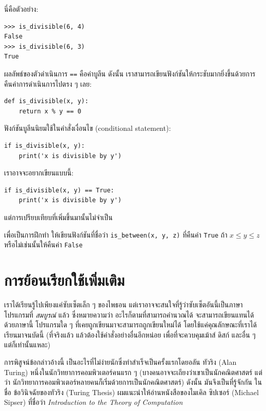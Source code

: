นี่คือตัวอย่าง:

\begin{verbatim}
>>> is_divisible(6, 4)
False
>>> is_divisible(6, 3)
True
\end{verbatim}
%
ผลลัพธ์ของตัวดำเนินการ {\tt ==} คือค่าบูลีน ดังนั้น 
เราสามารถเขียนฟังก์ชันให้กระชับมากยิ่งขึ้นด้วยการคืนค่าการดำเนินการไปตรง ๆ เลย:

\begin{verbatim}
def is_divisible(x, y):
    return x % y == 0
\end{verbatim}
%

ฟังก์ชันบูลีนนิยมใช้ในคำสั่งเงื่อนไข (conditional statement):

\begin{verbatim}
if is_divisible(x, y):
    print('x is divisible by y')
\end{verbatim}
%
เราอาจจะอยากเขียนแบบนี้:

\begin{verbatim}
if is_divisible(x, y) == True:
    print('x is divisible by y')
\end{verbatim}
%
แต่การเปรียบเทียบที่เพิ่มขึ้นมานั้นไม่จำเป็น

เพื่อเป็นการฝึกทำ ให้เขียนฟังก์ชันที่ชื่อว่า \verb"is_between(x, y, z)" ที่คืนค่า 
{\tt True} ถ้า {\scriptsize$x \le y \le z$} หรือไม่เช่นนั้นให้คืนค่า {\tt False}


\section{การย้อนเรียกใช้เพิ่มเติม} %
\label{more.recursion}

เราได้เรียนรู้ไปเพียงแค่ซับเซ็ตเล็ก ๆ ของไพธอน 
แต่เราอาจจะสนใจที่รู้ว่าซับเซ็ตอันนี้เป็นภาษาโปรแกรมที่ {\em สมบูรณ์} แล้ว ซึ่งหมายความว่า อะไรก็ตามที่สามารถคำนวณได้
จะสามารถเขียนแทนได้ด้วยภาษานี้  โปรแกรมใด ๆ ที่เคยถูกเขียนมาจะสามารถถูกเขียนใหม่ได้
โดยใช้แค่คุณลักษณะที่เราได้เรียนมาจนบัดนี้ (ที่จริงแล้ว แล้วต้องใช้คำสั่งอย่างอื่นอีกหน่อย
เพื่อที่จะควบคุมเม้าส์ ดิสก์ และอื่น ๆ แต่ก็เท่านั้นแหละ)

การพิสูจน์ข้อกล่าวอ้างนี้ เป็นอะไรที่ไม่ง่ายนักซึ่งทำสำเร็จเป็นครั้งแรกโดยอลัน ทัวริง (Alan Turing) 
หนึ่งในนักวิทยาการคอมพิวเตอร์คนแรก ๆ (บางคนอาจจะเถียงว่าเขาเป็นนักคณิตศาสตร์ แต่ว่า
นักวิทยาการคอมพิวเตอร์หลายคนก็เริ่มด้วยการเป็นนักคณิตศาสตร์)  ดังนั้น มันจึงเป็นที่รู้จักกัน
ในชื่อ ข้อวินิจฉัยของทัวริง (Turing Thesis) ผมแนะนำให้อ่านหนังสือของไมเคิล ซิปเซอร์ 
(Michael Sipser) ที่ชื่อว่า {\em Introduction to the Theory of Computation}

